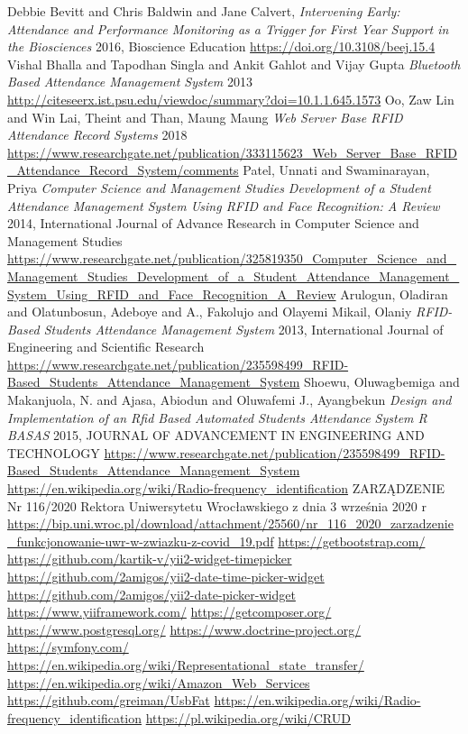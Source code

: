 \documentclass[declaration,shortabstract, mgr]{iithesis}
\begin{document}
\begin{thebibliography}{9}
		Debbie Bevitt and Chris Baldwin and Jane Calvert,
		\textit{Intervening Early: Attendance and Performance Monitoring as a Trigger for First Year Support in the Biosciences}
		2016, Bioscience Education
		\url{https://doi.org/10.3108/beej.15.4}
		Vishal Bhalla and Tapodhan Singla and Ankit Gahlot and Vijay Gupta
		\textit{Bluetooth Based Attendance Management System}
		2013
		\url{http://citeseerx.ist.psu.edu/viewdoc/summary?doi=10.1.1.645.1573}
		Oo, Zaw Lin and Win Lai, Theint and Than, Maung Maung
		\textit{Web Server Base RFID Attendance Record Systems}
		2018
		\url{https://www.researchgate.net/publication/333115623_Web_Server_Base_RFID_Attendance_Record_System/comments}
		Patel, Unnati and Swaminarayan, Priya
		\textit{Computer Science and Management Studies Development of a Student Attendance Management System Using RFID and Face Recognition: A Review}
		2014, International Journal of Advance Research in Computer Science and Management Studies
		\url{https://www.researchgate.net/publication/325819350_Computer_Science_and_Management_Studies_Development_of_a_Student_Attendance_Management_System_Using_RFID_and_Face_Recognition_A_Review}
		Arulogun, Oladiran and Olatunbosun, Adeboye and A., Fakolujo and Olayemi Mikail, Olaniy
		\textit{RFID-Based Students Attendance Management System}
		2013, International Journal of Engineering and Scientific Research
		\url{https://www.researchgate.net/publication/235598499_RFID-Based_Students_Attendance_Management_System}
		Shoewu, Oluwagbemiga and Makanjuola, N. and Ajasa, Abiodun and Oluwafemi J., Ayangbekun
		\textit{Design and Implementation of an Rfid Based Automated Students Attendance System R BASAS}
		2015, JOURNAL OF ADVANCEMENT IN ENGINEERING AND TECHNOLOGY
		\url{https://www.researchgate.net/publication/235598499_RFID-Based_Students_Attendance_Management_System}
		\url{https://en.wikipedia.org/wiki/Radio-frequency_identification}	
		ZARZĄDZENIE Nr 116/2020 Rektora Uniwersytetu Wrocławskiego z dnia 3 września 2020 r
		\url{https://bip.uni.wroc.pl/download/attachment/25560/nr_116_2020_zarzadzenie_funkcjonowanie-uwr-w-zwiazku-z-covid_19.pdf}
		\url{https://getbootstrap.com/}	
		\url{https://github.com/kartik-v/yii2-widget-timepicker}	
		\url{https://github.com/2amigos/yii2-date-time-picker-widget}	
		\url{https://github.com/2amigos/yii2-date-picker-widget}	
		\url{https://www.yiiframework.com/}
		\url{https://getcomposer.org/}	
		\url{https://www.postgresql.org/}
		\url{https://www.doctrine-project.org/}
		\url{https://symfony.com/}	
		\url{https://en.wikipedia.org/wiki/Representational_state_transfer/}
		\url{https://en.wikipedia.org/wiki/Amazon_Web_Services}	
		\url{https://github.com/greiman/UsbFat}
		\url{https://en.wikipedia.org/wiki/Radio-frequency_identification}	
		\url{https://pl.wikipedia.org/wiki/CRUD}	
		
		
		
\end{thebibliography}
\end{document}
